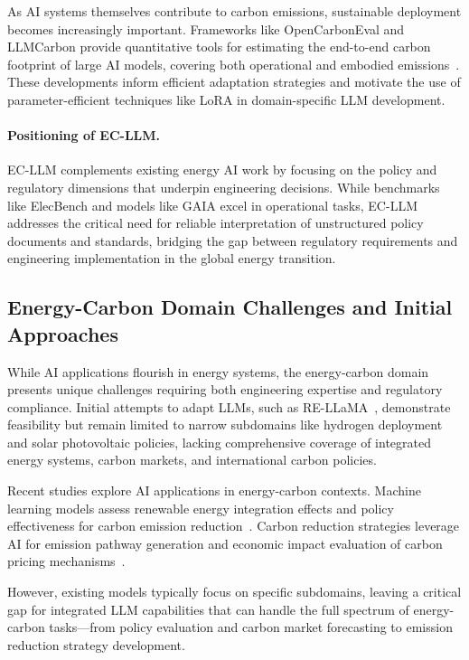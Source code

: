 \documentclass[]{interact}
\theoremstyle{plain}%
\theoremstyle{definition}
\theoremstyle{remark}
\begin{document}
As AI systems themselves contribute to carbon emissions, sustainable deployment becomes increasingly important. Frameworks like OpenCarbonEval and LLMCarbon provide quantitative tools for estimating the end-to-end carbon footprint of large AI models, covering both operational and embodied emissions~\cite{yu2024opencarboneval,faiz2023llmcarbon}. These developments inform efficient adaptation strategies and motivate the use of parameter-efficient techniques like LoRA in domain-specific LLM development.

\paragraph{Positioning of EC-LLM.} EC-LLM complements existing energy AI work by focusing on the policy and regulatory dimensions that underpin engineering decisions. While benchmarks like ElecBench and models like GAIA excel in operational tasks, EC-LLM addresses the critical need for reliable interpretation of unstructured policy documents and standards, bridging the gap between regulatory requirements and engineering implementation in the global energy transition.

\subsection{Energy-Carbon Domain Challenges and Initial Approaches}

While AI applications flourish in energy systems, the energy-carbon domain presents unique challenges requiring both engineering expertise and regulatory compliance. Initial attempts to adapt LLMs, such as RE-LLaMA~\cite{hemied2024re}, demonstrate feasibility but remain limited to narrow subdomains like hydrogen deployment and solar photovoltaic policies, lacking comprehensive coverage of integrated energy systems, carbon markets, and international carbon policies.

Recent studies explore AI applications in energy-carbon contexts. Machine learning models assess renewable energy integration effects and policy effectiveness for carbon emission reduction~\cite{jiang2023solution,spinti2023atikokan}. Carbon reduction strategies leverage AI for emission pathway generation and economic impact evaluation of carbon pricing mechanisms~\cite{wang2024ecological}.

However, existing models typically focus on specific subdomains, leaving a critical gap for integrated LLM capabilities that can handle the full spectrum of energy-carbon tasks—from policy evaluation and carbon market forecasting to emission reduction strategy development.
\end{document}
